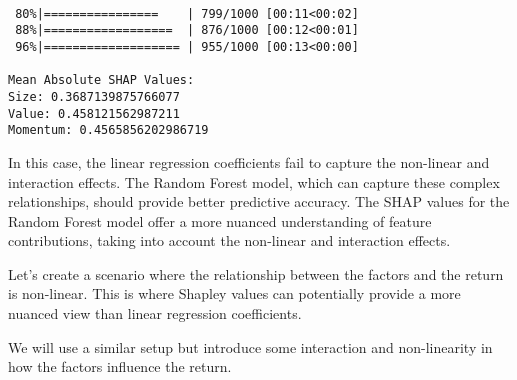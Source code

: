 \documentclass[
  letterpaper,
  DIV=11,
  numbers=noendperiod]{scrartcl}
\begin{document}
\begin{verbatim}

 80%|================    | 799/1000 [00:11<00:02]       
 88%|==================  | 876/1000 [00:12<00:01]       
 96%|=================== | 955/1000 [00:13<00:00]       

Mean Absolute SHAP Values:
Size: 0.3687139875766077
Value: 0.458121562987211
Momentum: 0.4565856202986719
\end{verbatim}

In this case, the linear regression coefficients fail to capture the
non-linear and interaction effects. The Random Forest model, which can
capture these complex relationships, should provide better predictive
accuracy. The SHAP values for the Random Forest model offer a more
nuanced understanding of feature contributions, taking into account the
non-linear and interaction effects.

Let's create a scenario where the relationship between the factors and
the return is non-linear. This is where Shapley values can potentially
provide a more nuanced view than linear regression coefficients.

We will use a similar setup but introduce some interaction and
non-linearity in how the factors influence the return.
\end{document}
